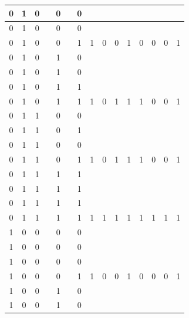 \begin{table}[!tb]
\begin{tabular}{|c|c|c|c|c|c|c|c|c|c|c|c|c|c|c|}
        \rowcolor{yellow!40} 0 & 1 & 0 &  & 0 &  & 0 &  &  &  &  &  &  &  &  \\ \hline
        \rowcolor{yellow!40} 0 & 1 & 0 &  & 0 &  & 0 &  &  &  &  &  &  &  &  \\ \hline
        \rowcolor{yellow!40} 0 & 1 & 0 &  & 0 &  & 1 & 1 & 0 & 0 & 1 & 0 & 0 & 0 & 1 \\ \hline
        \rowcolor{gray!40} 0 & 1 & 0 &  & 1 &  & 0 &  &  &  &  &  &  &  &  \\ \hline
        \rowcolor{gray!40} 0 & 1 & 0 &  & 1 &  & 0 &  &  &  &  &  &  &  &  \\ \hline
        \rowcolor{gray!40} 0 & 1 & 0 &  & 1 &  & 1 &  &  &  &  &  &  &  &  \\ \hline
        \rowcolor{gray!40} 0 & 1 & 0 &  & 1 &  & 1 & 1 & 0 & 1 & 1 & 1 & 0 & 0 & 1 \\ \hline
        \rowcolor{blue!40} 0 & 1 & 1 &  & 0 &  & 0 &  &  &  &  &  &  &  &  \\ \hline
        \rowcolor{blue!40} 0 & 1 & 1 &  & 0 &  & 1 &  &  &  &  &  &  &  &  \\ \hline
        \rowcolor{blue!40} 0 & 1 & 1 &  & 0 &  & 0 &  &  &  &  &  &  &  &  \\ \hline
        \rowcolor{blue!40} 0 & 1 & 1 &  & 0 &  & 1 & 1 & 0 & 1 & 1 & 1 & 0 & 0 & 1 \\ \hline
        \rowcolor{red!40} 0 & 1 & 1 &  & 1 &  & 1 &  &  &  &  &  &  &  &  \\ \hline
        \rowcolor{red!40} 0 & 1 & 1 &  & 1 &  & 1 &  &  &  &  &  &  &  &  \\ \hline
        \rowcolor{red!40} 0 & 1 & 1 &  & 1 &  & 1 &  &  &  &  &  &  &  &  \\ \hline
        \rowcolor{red!40} 0 & 1 & 1 &  & 1 &  & 1 & 1 & 1 & 1 & 1 & 1 & 1 & 1 & 1 \\ \hline
        \rowcolor{green!40} 1 & 0 & 0 &  & 0 &  & 0 &  &  &  &  &  &  &  &  \\ \hline
        \rowcolor{green!40} 1 & 0 & 0 &  & 0 &  & 0 &  &  &  &  &  &  &  &  \\ \hline
        \rowcolor{green!40} 1 & 0 & 0 &  & 0 &  & 0 &  &  &  &  &  &  &  &  \\ \hline
        \rowcolor{green!40} 1 & 0 & 0 &  & 0 &  & 1 & 1 & 0 & 0 & 1 & 0 & 0 & 0 & 1 \\ \hline
        \rowcolor{yellow!40} 1 & 0 & 0 &  & 1 &  & 0 &  &  &  &  &  &  &  &  \\ \hline
        \rowcolor{yellow!40} 1 & 0 & 0 &  & 1 &  & 0 &  &  &  &  &  &  &  &  \\ \hline

\end{tabular}
\end{table}

